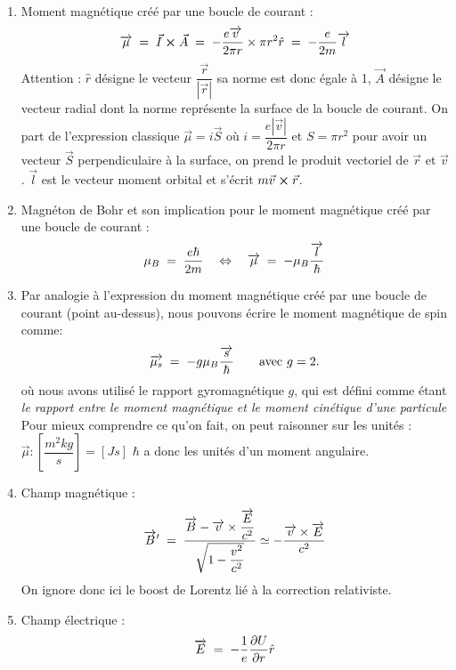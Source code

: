 \begin{enumerate}
    \item Moment magnétique créé par une boucle de courant : 
    \begin{equation*}
        \overrightarrow{\mu} \; = \; \vec{I}\cross \vec{A} \; = \; -\dfrac{e\overrightarrow{v}}{2\pi r}\times \pi r^2\hat{r} \; = \; -\dfrac{e}{2m}\overrightarrow{l}
    \end{equation*}
    Attention : $\hat{r}$ désigne le vecteur $\dfrac{\vec{r}}{|\vec{r}|}$ sa norme est donc égale à 1, $\vec{A}$ désigne le vecteur radial dont la norme représente la surface de la boucle de courant. On part de l'expression classique $\vec{\mu} = i\vec{S}$ où $i = \dfrac{e|\vec{v}|}{2\pi r}$ et $S = \pi r^2$ pour avoir un vecteur $\vec{S}$ perpendiculaire à la surface, on prend le produit vectoriel de $\vec{r}$ et $\vec{v}$. $\vec{l}$ est le vecteur moment orbital et s'écrit $m\vec{v}\cross\vec{r}$.
    \item Magnéton de Bohr et son implication pour le moment magnétique créé par une boucle de courant : 
    \begin{equation*}
        \mu_B \; = \; \dfrac{e\hbar}{2m} \quad \Leftrightarrow \quad \overrightarrow{\mu} \; = \; -\mu_B\dfrac{\overrightarrow{l}}{\hbar}
    \end{equation*}
    \item Par analogie à l'expression du moment magnétique créé par une boucle de courant (point au-dessus), nous pouvons écrire le moment magnétique de spin comme:
    \begin{equation*}
        \overrightarrow{\mu_s} \; = \; -g\mu_B\dfrac{\overrightarrow{s}}{\hbar} \qquad \textrm{avec } g=2.
    \end{equation*}
    où nous avons utilisé le rapport gyromagnétique $g$, qui est défini comme étant \textit{le rapport entre le moment magnétique  et le moment cinétique d'une particule}\\
    Pour mieux comprendre ce qu'on fait, on peut raisonner sur les unités : $\vec{\mu} : [\dfrac{m^2kg}{s}] = [Js]$ $\hbar$ a donc les unités d'un moment angulaire.
    \item Champ magnétique :
    \begin{equation*}
        \overrightarrow{B}' \; = \; \dfrac{\overrightarrow{B} - \overrightarrow{v}\times \dfrac{\overrightarrow{E}}{c^2}}{\sqrt{1-\dfrac{v^2}{c^2}}} \simeq -\dfrac{\overrightarrow{v}\times \overrightarrow{E}}{c^2}
    \end{equation*}
    On ignore donc ici le boost de Lorentz lié à la correction relativiste.
    \item Champ électrique :
    \begin{equation*}
        \overrightarrow{E} \; = \;  -\dfrac{1}{e}\dfrac{\partial U}{\partial r}\hat{r}
    \end{equation*}
\end{enumerate}

